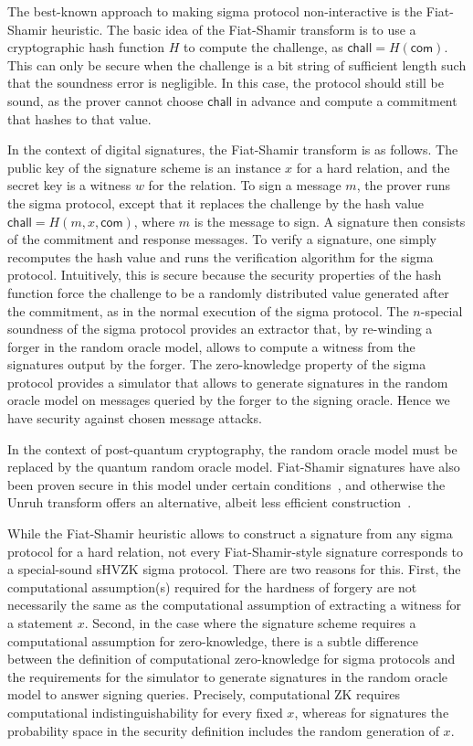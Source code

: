 \documentclass{llncs}
\newcommand{\com}{\mathsf{com}}
\newcommand{\chall}{\mathsf{chall}}
\newcommand{\develop}[1]{{\color{blue}#1}}
\begin{document}
The best-known approach to making sigma protocol non-interactive is the Fiat-Shamir heuristic.
The basic idea of the Fiat-Shamir transform is to use a cryptographic hash function $H$ to compute the challenge, as $\chall  = H(\com)$. This can only be secure when the challenge is a bit string of sufficient length such that the soundness error is negligible. In this case, the protocol should still be sound, as the prover cannot choose $\chall$ in advance and compute a commitment that hashes to that value.

In the context of digital signatures, the Fiat-Shamir transform is as follows.
The public key of the signature scheme is an instance $x$ for a hard relation, and the secret key is a witness $w$ for the relation. To sign a message $m$, the prover runs the sigma protocol, except that it replaces the challenge by the hash value $\chall = H(m,x,\com)$, where $m$ is the message to sign.
A signature then consists of the commitment and response messages. To verify a signature, one simply recomputes the hash value and runs the verification algorithm for the sigma protocol. Intuitively, this is secure because the security properties of the hash function force the challenge to be a randomly distributed value generated after the commitment, as in the normal execution of the sigma protocol.
The $n$-special soundness of the sigma protocol provides an extractor that, by re-winding a forger in the random oracle model, allows to compute a witness from the signatures output by the forger.
The zero-knowledge property of the sigma protocol provides a simulator that allows to generate signatures in the random oracle model on messages queried by the forger to the signing oracle. Hence we have security against chosen message attacks.


In the context of post-quantum cryptography, the random oracle model must be replaced by the {quantum} random oracle model. 
%
Fiat-Shamir signatures have also been proven secure in this model under certain conditions~\cite{KLS18}, and otherwise the Unruh transform offers an alternative, albeit less efficient construction~\cite{Unruh15}. 

While the Fiat-Shamir heuristic allows to construct a signature from any sigma protocol for a hard relation, not every Fiat-Shamir-style signature corresponds to a special-sound sHVZK sigma protocol.
There are two reasons for this.
First, the computational assumption(s) required for the hardness of forgery are not necessarily the same as the computational assumption of extracting a witness for a statement $x$.
Second, in the case where the signature scheme requires a computational assumption for zero-knowledge, there is a subtle difference between the definition of computational zero-knowledge for sigma protocols and the requirements for the simulator to generate signatures in the random oracle model to answer signing queries. 
Precisely, computational ZK requires computational indistinguishability for every fixed $x$, whereas for signatures the probability space in the security definition includes the random generation of $x$.
\end{document}
